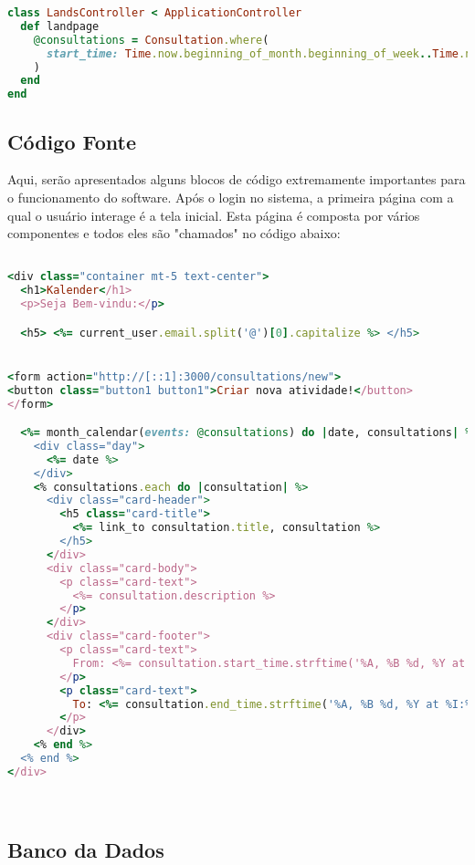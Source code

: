 \begin{lstlisting}[language=Ruby, caption=Ruby LandsController]
  class LandsController < ApplicationController
  def landpage
    @consultations = Consultation.where(
      start_time: Time.now.beginning_of_month.beginning_of_week..Time.now.end_of_month.end_of_week
    )
  end
end

\end{lstlisting}

\subsection{Código Fonte}

Aqui, serão apresentados alguns blocos de código extremamente importantes para o funcionamento do software. Após o login no sistema, a primeira página com a qual o usuário interage é a tela inicial. Esta página é composta por vários componentes e todos eles são "chamados" no código abaixo:


\begin{lstlisting}[language=Ruby, caption=Landpage]

<div class="container mt-5 text-center">
  <h1>Kalender</h1>
  <p>Seja Bem-vindu:</p>

  <h5> <%= current_user.email.split('@')[0].capitalize %> </h5>


<form action="http://[::1]:3000/consultations/new">
<button class="button1 button1">Criar nova atividade!</button>
</form>

  <%= month_calendar(events: @consultations) do |date, consultations| %>
    <div class="day">
      <%= date %>
    </div>
    <% consultations.each do |consultation| %>
      <div class="card-header">
        <h5 class="card-title">
          <%= link_to consultation.title, consultation %>
        </h5>
      </div>
      <div class="card-body">
        <p class="card-text">
          <%= consultation.description %>
        </p>
      </div>
      <div class="card-footer">
        <p class="card-text">
          From: <%= consultation.start_time.strftime('%A, %B %d, %Y at %I:%M %p') %>
        </p>
        <p class="card-text">
          To: <%= consultation.end_time.strftime('%A, %B %d, %Y at %I:%M %p') %>
        </p>
      </div>
    <% end %>
  <% end %>
</div>




\end{lstlisting}

\subsection{Banco da Dados}


